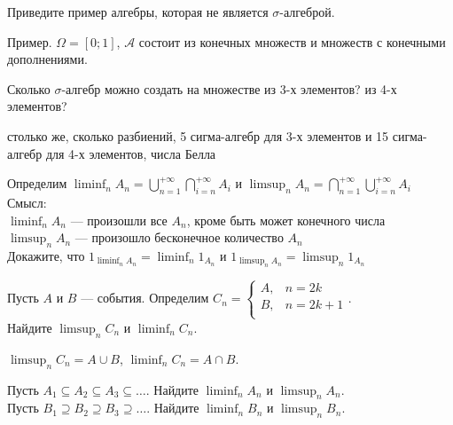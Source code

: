 \begin{solution}
\begin{problem}
Приведите пример алгебры, которая не является $\sigma$-алгеброй.
\end{problem} 
\begin{solution} 
Пример. $\Omega=[0;1]$, $\mathcal{A}$ состоит из конечных множеств и множеств с конечными дополнениями.
\end{solution}

\begin{problem}
Сколько $\sigma$-алгебр можно создать на множестве из 3-х элементов? из 4-х элементов? 
\end{problem} 
\begin{solution} 
столько же, сколько разбиений, 5 сигма-алгебр для 3-х элементов и 15 сигма-алгебр для 4-х элементов, числа Белла 
\end{solution}

\begin{problem}
Определим $\liminf_{n}
A_{n}=\bigcup_{n=1}^{+\infty}\bigcap_{i=n}^{+\infty}A_{i}$ и
$\limsup_{n}
A_{n}=\bigcap_{n=1}^{+\infty}\bigcup_{i=n}^{+\infty}A_{i}$ \\
Смысл: \\
$\liminf_{n} A_{n}$ --- произошли все $A_{n}$, кроме быть может
конечного числа \\
$\limsup_{n} A_{n}$ --- произошло бесконечное количество $A_{n}$ \\
Докажите, что $1_{\liminf_{n}A_{n}}=\liminf_{n}1_{A_{n}}$ и
$1_{\limsup_{n}A_{n}}=\limsup_{n}1_{A_{n}}$ 
\end{problem} 
\begin{solution} 

\end{solution}

\begin{problem}
Пусть $A$ и $B$ --- события. Определим $C_{n}=
\begin{cases}
  A, & n=2k \\
  B, & n=2k+1 \\
\end{cases}$. \\
Найдите $\limsup_{n}C_{n}$ и $\liminf_{n}C_{n}$.
\end{problem} 
\begin{solution} 
$\limsup_{n}C_{n}=A\cup B$, $\liminf_{n}C_{n}=A\cap B$. 
\end{solution}

\begin{problem}
Пусть $A_{1} \subseteq A_{2} \subseteq A_{3} \subseteq \ldots$.
Найдите $\liminf_{n}A_{n}$ и $\limsup_{n}A_{n}$. \\
Пусть $B_{1} \supseteq B_{2} \supseteq B_{3} \supseteq \ldots$.
Найдите $\liminf_{n}B_{n}$ и $\limsup_{n}B_{n}$. 


\end{problem}
\end{solution}

